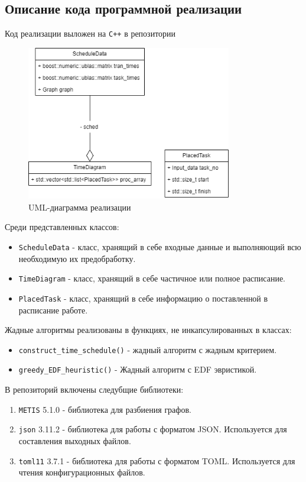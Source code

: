 \subsection{Описание кода программной реализации}
Код реализации выложен на \texttt{C++} в репозитории \cite{Repository}

\begin{figure}[ht]
    \centering
    \includegraphics[width=0.8\textwidth]{imgs/final_UML.drawio.png}
    \caption{UML-диаграмма реализации}
    \label{fig:UML}
\end{figure}

Среди представленных классов:
\begin{itemize}
    \item \texttt{ScheduleData} - класс, хранящий в себе входные данные и выполняющий всю необходимую их предобработку.
    \item \texttt{TimeDiagram} - класс, хранящий в себе частичное или полное расписание.
    \item \texttt{PlacedTask} - класс, хранящий в себе информацию о поставленной в расписание работе.
\end{itemize}

Жадные алгоритмы реализованы в функциях, не инкапсулированных в классах:
\begin{itemize}
    \item \texttt{construct_time_schedule()} - жадный алгоритм с жадным критерием.
    \item \texttt{greedy_EDF_heuristic()} - Жадный алгоритм с EDF эвристикой.
\end{itemize}

В репозиторий включены следубщие библиотеки:
\begin{enumerate}
    \item \texttt{METIS} 5.1.0 \cite{METIS_lib} - библиотека для разбиения графов.
    \item \texttt{json} 3.11.2 \cite{json_lib} - библиотека для работы с форматом JSON. Используется для составления выходных файлов.
    \item \texttt{toml11} 3.7.1 \cite{toml11_lib} - библиотека для работы с форматом TOML. Используется для чтения конфигурационных файлов.
\end{enumerate}

